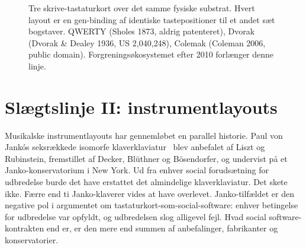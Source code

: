 \documentclass[10pt,letterpaper,twocolumn]{article}
\begin{document}
\begin{figure}[t]
\centering
{}
\caption{Tre skrive-tastaturkort over det samme fysiske substrat. Hvert layout er en gen-binding af identiske tastepositioner til et andet sæt bogstaver. QWERTY (Sholes 1873, aldrig patenteret), Dvorak (Dvorak \& Dealey 1936, US 2{,}040{,}248), Colemak (Coleman 2006, public domain). Forgreningsøkosystemet efter 2010 forlænger denne linje.}
\label{fig:typing-layouts}
\end{figure}

\section{Slægtslinje II: instrumentlayouts}
\label{sec:lineage2}

Musikalske instrumentlayouts har gennemløbet en parallel historie. Paul von Jankós seksrækkede isomorfe klaverklaviatur~\citep{janko1882} blev anbefalet af Liszt og Rubinstein, fremstillet af Decker, Blüthner og Bösendorfer, og undervist på et Janko-konservatorium i New York. Ud fra enhver social forudsætning for udbredelse burde det have erstattet det almindelige klaverklaviatur. Det skete ikke. Færre end ti Janko-klaverer vides at have overlevet. Janko-tilfældet er den negative pol i argumentet om tastaturkort-som-social-software: enhver betingelse for udbredelse var opfyldt, og udbredelsen slog alligevel fejl. Hvad social software-kontrakten end er, er den mere end summen af anbefalinger, fabrikanter og konservatorier.
\end{document}
